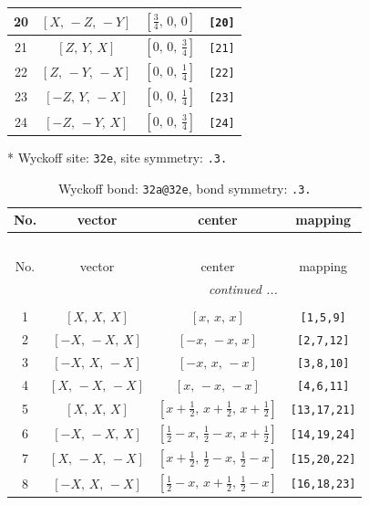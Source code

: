 \documentclass[fleqn,8pt]{jsarticle}
\begin{document}
\begin{longtable}{cccc}
20 & $\left[ X,\, - Z,\, - Y \right]$ & $\left[ \frac{3}{4},\, 0,\, 0 \right]$ & {\tt [20]} \\ \hline
21 & $\left[ Z,\, Y,\, X \right]$ & $\left[ 0,\, 0,\, \frac{3}{4} \right]$ & {\tt [21]} \\ \hline
22 & $\left[ Z,\, - Y,\, - X \right]$ & $\left[ 0,\, 0,\, \frac{1}{4} \right]$ & {\tt [22]} \\ \hline
23 & $\left[ - Z,\, Y,\, - X \right]$ & $\left[ 0,\, 0,\, \frac{1}{4} \right]$ & {\tt [23]} \\ \hline
24 & $\left[ - Z,\, - Y,\, X \right]$ & $\left[ 0,\, 0,\, \frac{3}{4} \right]$ & {\tt [24]} \\
\end{longtable}
* Wyckoff site: {\tt 32e}, site symmetry: {\tt .3.}
\renewcommand{\arraystretch}{1.2}
\begin{longtable}{cccc}
\caption{Wyckoff bond: {\tt 32a@32e}, bond symmetry: {\tt .3.}}
 \\
 \hline \hline
No. & vector & center & mapping \\ \hline \endfirsthead

\multicolumn{3}{l}{\tablename\ \thetable{}} \\
 \hline \hline
No. & vector & center & mapping \\ \hline \endhead

 \hline \hline
\multicolumn{3}{r}{\footnotesize\it continued ...} \\ \endfoot

 \hline \hline
\multicolumn{3}{r}{} \\ \endlastfoot

1 & $\left[ X,\, X,\, X \right]$ & $\left[ x,\, x,\, x \right]$ & {\tt [1,5,9]} \\ \hline
2 & $\left[ - X,\, - X,\, X \right]$ & $\left[ - x,\, - x,\, x \right]$ & {\tt [2,7,12]} \\ \hline
3 & $\left[ - X,\, X,\, - X \right]$ & $\left[ - x,\, x,\, - x \right]$ & {\tt [3,8,10]} \\ \hline
4 & $\left[ X,\, - X,\, - X \right]$ & $\left[ x,\, - x,\, - x \right]$ & {\tt [4,6,11]} \\ \hline
5 & $\left[ X,\, X,\, X \right]$ & $\left[ x + \frac{1}{2},\, x + \frac{1}{2},\, x + \frac{1}{2} \right]$ & {\tt [13,17,21]} \\ \hline
6 & $\left[ - X,\, - X,\, X \right]$ & $\left[ \frac{1}{2} - x,\, \frac{1}{2} - x,\, x + \frac{1}{2} \right]$ & {\tt [14,19,24]} \\ \hline
7 & $\left[ X,\, - X,\, - X \right]$ & $\left[ x + \frac{1}{2},\, \frac{1}{2} - x,\, \frac{1}{2} - x \right]$ & {\tt [15,20,22]} \\ \hline
8 & $\left[ - X,\, X,\, - X \right]$ & $\left[ \frac{1}{2} - x,\, x + \frac{1}{2},\, \frac{1}{2} - x \right]$ & {\tt [16,18,23]} \\
\end{longtable}
\end{document}
